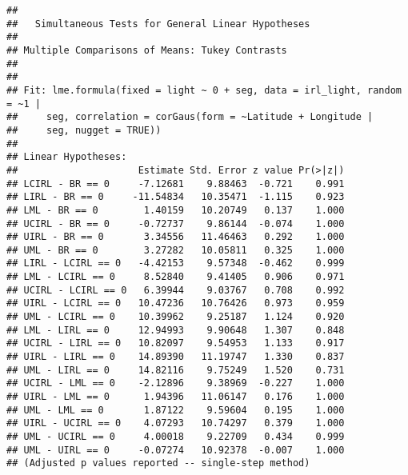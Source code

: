 \documentclass[letterpaper,12pt]{article}\usepackage[]{graphicx}\usepackage[]{color}
\makeatletter
\newenvironment{kframe}{%
 \def\at@end@of@kframe{}%
 \ifinner\ifhmode%
  \def\at@end@of@kframe{\end{minipage}}%
  \begin{minipage}{\columnwidth}%
 \fi\fi%
 \def\FrameCommand##1{\hskip\@totalleftmargin \hskip-\fboxsep
 \colorbox{shadecolor}{##1}\hskip-\fboxsep
     \hskip-\linewidth \hskip-\@totalleftmargin \hskip\columnwidth}%
 \MakeFramed {\advance\hsize-\width
   \@totalleftmargin\z@ \linewidth\hsize
   \@setminipage}}%
 {\par\unskip\endMakeFramed%
 \at@end@of@kframe}
\newenvironment{knitrout}{}{} %
\makeatother
\begin{document}
\begin{knitrout}
\begin{kframe}
\begin{alltt}
\end{alltt}
\begin{verbatim}
## 
## 	 Simultaneous Tests for General Linear Hypotheses
## 
## Multiple Comparisons of Means: Tukey Contrasts
## 
## 
## Fit: lme.formula(fixed = light ~ 0 + seg, data = irl_light, random = ~1 | 
##     seg, correlation = corGaus(form = ~Latitude + Longitude | 
##     seg, nugget = TRUE))
## 
## Linear Hypotheses:
##                     Estimate Std. Error z value Pr(>|z|)
## LCIRL - BR == 0     -7.12681    9.88463  -0.721    0.991
## LIRL - BR == 0     -11.54834   10.35471  -1.115    0.923
## LML - BR == 0        1.40159   10.20749   0.137    1.000
## UCIRL - BR == 0     -0.72737    9.86144  -0.074    1.000
## UIRL - BR == 0       3.34556   11.46463   0.292    1.000
## UML - BR == 0        3.27282   10.05811   0.325    1.000
## LIRL - LCIRL == 0   -4.42153    9.57348  -0.462    0.999
## LML - LCIRL == 0     8.52840    9.41405   0.906    0.971
## UCIRL - LCIRL == 0   6.39944    9.03767   0.708    0.992
## UIRL - LCIRL == 0   10.47236   10.76426   0.973    0.959
## UML - LCIRL == 0    10.39962    9.25187   1.124    0.920
## LML - LIRL == 0     12.94993    9.90648   1.307    0.848
## UCIRL - LIRL == 0   10.82097    9.54953   1.133    0.917
## UIRL - LIRL == 0    14.89390   11.19747   1.330    0.837
## UML - LIRL == 0     14.82116    9.75249   1.520    0.731
## UCIRL - LML == 0    -2.12896    9.38969  -0.227    1.000
## UIRL - LML == 0      1.94396   11.06147   0.176    1.000
## UML - LML == 0       1.87122    9.59604   0.195    1.000
## UIRL - UCIRL == 0    4.07293   10.74297   0.379    1.000
## UML - UCIRL == 0     4.00018    9.22709   0.434    0.999
## UML - UIRL == 0     -0.07274   10.92378  -0.007    1.000
## (Adjusted p values reported -- single-step method)
\end{verbatim}
\end{kframe}
\end{knitrout}
\end{document}
